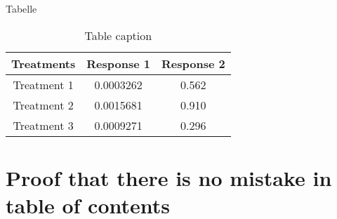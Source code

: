 \begin{frame}{Tabelle}
	\centering
	\begin{table}
		\begin{tabular}{c c c}
			\hline
			\textbf{Treatments} & \textbf{Response 1} & \textbf{Response 2} \\
			\hline
			Treatment 1         & 0.0003262           & 0.562               \\
			Treatment 2         & 0.0015681           & 0.910               \\
			Treatment 3         & 0.0009271           & 0.296               \\
			\hline
		\end{tabular}
		\caption{Table caption}
	\end{table}
\end{frame}


%
%

\section[Test]{Proof that there is no mistake in table of contents}